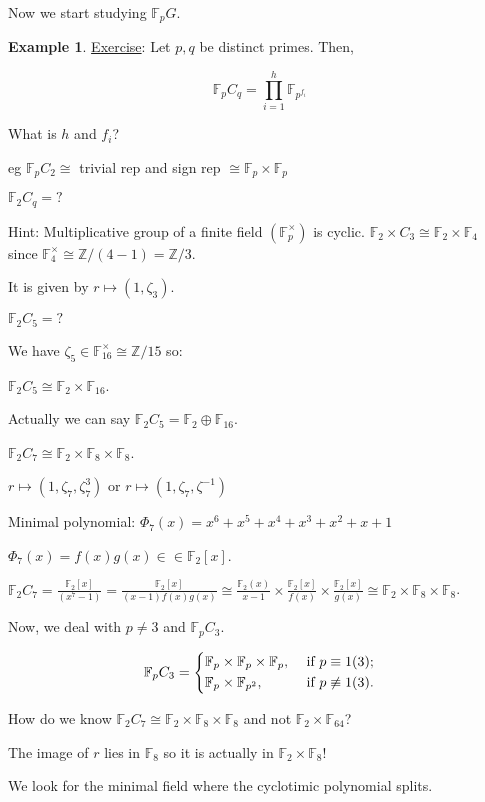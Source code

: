 \documentclass{article}
\theoremstyle{definition}
\newtheorem*{example}{Example}
\begin{document}
Now we start studying \(\mathbb{F}_p G\).

\begin{example}
    \underline{Exercise}: Let \(p,q\) be distinct primes. Then,

    \[
        \mathbb{F}_p C_q = \prod_{i=1}^h \mathbb{F}_{p^{f_i}}
    \]

    What is \(h\) and \(f_i\)?

    eg \(\mathbb{F}_p C_2 \cong\) trivial rep and sign rep \(\cong \mathbb{F}_p \times \mathbb{F}_p\)

    \(\mathbb{F}_2 C_q = ?\)

    Hint: Multiplicative group of a finite field \((\mathbb{F}_p^\times)\) is cyclic.
    \(\mathbb{F}_2 \times C_3 \cong \mathbb{F}_2 \times \mathbb{F}_4\) since \(\mathbb{F}_4^\times \cong \mathbb{Z} / (4-1) = \mathbb{Z} / 3\).

    It is given by \(r \mapsto (1, \zeta_3)\).

    \(\mathbb{F}_2 C_5 = ?\)

    We have \(\zeta_5 \in \mathbb{F}_{16}^\times \cong \mathbb{Z} / 15\) so:

    \(\mathbb{F}_2 C_5 \cong \mathbb{F}_2 \times \mathbb{F}_{16}\).

    Actually we can say \(\mathbb{F}_2 C_5 = \mathbb{F}_2 \oplus \mathbb{F}_{16}\).

    \(\mathbb{F}_2 C_7 \cong \mathbb{F}_2 \times \mathbb{F}_8 \times \mathbb{F}_8\).
    
    \(r \mapsto (1 , \zeta_7, \zeta_7^3)\) or \(r \mapsto (1, \zeta_7, \zeta ^{-1})\) 
    
    Minimal polynomial: \(\Phi_7(x) = x^6 + x^5 + x^4 + x^3 + x^2 + x + 1\) 

    \(\Phi_7(x) = f(x) g(x) \in \in \mathbb{F}_2[x]\).

    \(\mathbb{F}_2 C_7 = \frac{\mathbb{F}_2[x]}{(x^7 - 1)} = \frac{\mathbb{F}_2[x]}{(x-1)f(x) g(x)} \cong \frac{\mathbb{F}_2(x)}{x-1} \times \frac{\mathbb{F}_2[x]}{f(x)} \times \frac{\mathbb{F}_2[x]}{g(x)} \cong \mathbb{F}_2 \times \mathbb{F}_8 \times \mathbb{F}_8\).

    Now, we deal with \(p\neq 3\) and \(\mathbb{F}_p C_3\).

    \[
        \mathbb{F}_p C_3 = \begin{dcases}
            \mathbb{F}_p \times \mathbb{F}_p \times \mathbb{F}_p, &\text{ if } p \equiv 1 (3) ;\\
            \mathbb{F}_p \times \mathbb{F}_{p^2}, &\text{ if } p \not\equiv 1 (3).
        \end{dcases}
    \]

    How do we know \(\mathbb{F}_2 C_7 \cong \mathbb{F}_2 \times \mathbb{F}_8 \times \mathbb{F}_8\) and not \(\mathbb{F}_2 \times \mathbb{F}_{64}\)?

    The image of \(r\) lies in \(\mathbb{F}_8\) so it is actually in \(\mathbb{F}_2 \times \mathbb{F}_8\)!

    We look for the minimal field where the cyclotimic polynomial splits.

\end{example}
\end{document}

